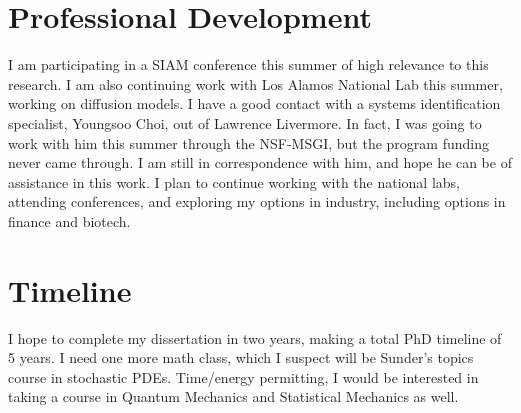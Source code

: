 \documentclass[12pt]{article}
\numberwithin{equation}{section}
\begin{document}
\section{Professional Development}
\par I am participating in a SIAM conference this summer of high relevance to this research. I am also continuing work with Los Alamos National Lab this summer, working on diffusion models. I have a good contact with a systems identification specialist, Youngsoo Choi, out of Lawrence Livermore. In fact, I was going to work with him this summer through the NSF-MSGI, but the program funding never came through. I am still in correspondence with him, and hope he can be of assistance in this work. I plan to continue working with the national labs, attending conferences, and exploring my options in industry, including options in finance and biotech.

\section{Timeline}
\par I hope to complete my dissertation in two years, making a total PhD timeline of 5 years. I need one more math class, which I suspect will be Sunder's topics course in stochastic PDEs. Time/energy permitting, I would be interested in taking a course in Quantum Mechanics and Statistical Mechanics as well.
\end{document}
